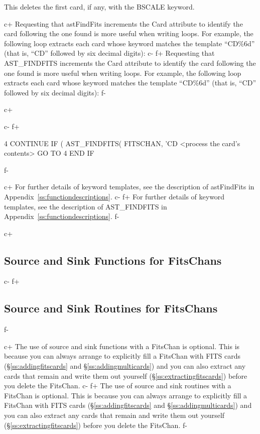 \documentclass[twoside,11pt]{starlink}
\providecommand{\appref}[1]{Appendix~\ref{#1}}
\providecommand{\secref}[1]{\S\ref{#1}}
\begin{document}
This deletes the first card, if any, with the BSCALE keyword.

c+
Requesting that astFindFits increments the Card attribute to identify
the card following the one found is more useful when writing loops.
For example, the following loop extracts each card whose keyword
matches the template ``CD\%6d'' (that is, ``CD'' followed by six
decimal digits):
c-
f+
Requesting that AST\_FINDFITS increments the Card attribute to
identify the card following the one found is more useful when writing
loops.  For example, the following loop extracts each card whose
keyword matches the template ``CD\%6d'' (that is, ``CD'' followed by
six decimal digits):
f-

c+
\small
{}
\normalsize
c-
f+
\small
\begin{terminalv}
 4    CONTINUE
      IF ( AST_FINDFITS( FITSCHAN, 'CD%
         <process the card's contents>
         GO TO 4
      END IF
\end{terminalv}
\normalsize
f-

c+
For further details of keyword templates, see the description of
astFindFits in \appref{ss:functiondescriptions}.
c-
f+
For further details of keyword templates, see the description of
AST\_FINDFITS in \appref{ss:functiondescriptions}.
f-

c+
\subsection{\label{ss:fitssourceandsink}Source and Sink Functions for FitsChans}
c-
f+
\subsection{\label{ss:fitssourceandsink}Source and Sink Routines for FitsChans}
f-

c+
The use of source and sink functions with a FitsChan is optional. This
is because you can always arrange to explicitly fill a FitsChan with
FITS cards (\secref{ss:addingfitscards} and \secref{ss:addingmulticards})
and you can also extract any
cards that remain and write them out yourself
(\secref{ss:extractingfitscards}) before you delete the FitsChan.
c-
f+
The use of source and sink routines with a FitsChan is optional. This
is because you can always arrange to explicitly fill a FitsChan with
FITS cards (\secref{ss:addingfitscards} and \secref{ss:addingmulticards})
and you can also extract any
cards that remain and write them out yourself
(\secref{ss:extractingfitscards}) before you delete the FitsChan.
f-
\end{document}
